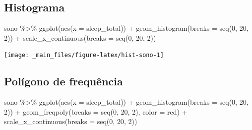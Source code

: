 \documentclass[
  12pt]{report}
\newenvironment{Shaded}{\begin{snugshade}}{\end{snugshade}}
\newcommand{\AttributeTok}[1]{\textcolor[rgb]{0.77,0.63,0.00}{#1}}
\newcommand{\DecValTok}[1]{\textcolor[rgb]{0.00,0.00,0.81}{#1}}
\newcommand{\FunctionTok}[1]{\textcolor[rgb]{0.00,0.00,0.00}{#1}}
\newcommand{\NormalTok}[1]{#1}
\newcommand{\SpecialCharTok}[1]{\textcolor[rgb]{0.00,0.00,0.00}{#1}}
\newcommand{\StringTok}[1]{\textcolor[rgb]{0.31,0.60,0.02}{#1}}
\begin{document}
\hypertarget{histograma}{%
\subsection{Histograma}\label{histograma}}

\begin{Shaded}
\begin{Highlighting}[]
\NormalTok{sono }\SpecialCharTok{\%\textgreater{}\%} 
  \FunctionTok{ggplot}\NormalTok{(}\FunctionTok{aes}\NormalTok{(}\AttributeTok{x =}\NormalTok{ sleep\_total)) }\SpecialCharTok{+}
    \FunctionTok{geom\_histogram}\NormalTok{(}\AttributeTok{breaks =} \FunctionTok{seq}\NormalTok{(}\DecValTok{0}\NormalTok{, }\DecValTok{20}\NormalTok{, }\DecValTok{2}\NormalTok{)) }\SpecialCharTok{+}
    \FunctionTok{scale\_x\_continuous}\NormalTok{(}\AttributeTok{breaks =} \FunctionTok{seq}\NormalTok{(}\DecValTok{0}\NormalTok{, }\DecValTok{20}\NormalTok{, }\DecValTok{2}\NormalTok{))}
\end{Highlighting}
\end{Shaded}

\begin{center}\texttt{[image: \_main\_files/figure-latex/hist-sono-1]} \end{center}

\hypertarget{poluxedgono-de-frequuxeancia}{%
\subsection{Polígono de frequência}\label{poluxedgono-de-frequuxeancia}}

\begin{Shaded}
\begin{Highlighting}[]
\NormalTok{sono }\SpecialCharTok{\%\textgreater{}\%} 
  \FunctionTok{ggplot}\NormalTok{(}\FunctionTok{aes}\NormalTok{(}\AttributeTok{x =}\NormalTok{ sleep\_total)) }\SpecialCharTok{+}
    \FunctionTok{geom\_histogram}\NormalTok{(}\AttributeTok{breaks =} \FunctionTok{seq}\NormalTok{(}\DecValTok{0}\NormalTok{, }\DecValTok{20}\NormalTok{, }\DecValTok{2}\NormalTok{)) }\SpecialCharTok{+}
    \FunctionTok{geom\_freqpoly}\NormalTok{(}\AttributeTok{breaks =} \FunctionTok{seq}\NormalTok{(}\DecValTok{0}\NormalTok{, }\DecValTok{20}\NormalTok{, }\DecValTok{2}\NormalTok{), }\AttributeTok{color =} \StringTok{\textquotesingle{}red\textquotesingle{}}\NormalTok{) }\SpecialCharTok{+}
    \FunctionTok{scale\_x\_continuous}\NormalTok{(}\AttributeTok{breaks =} \FunctionTok{seq}\NormalTok{(}\DecValTok{0}\NormalTok{, }\DecValTok{20}\NormalTok{, }\DecValTok{2}\NormalTok{))}
\end{Highlighting}
\end{Shaded}
\end{document}
